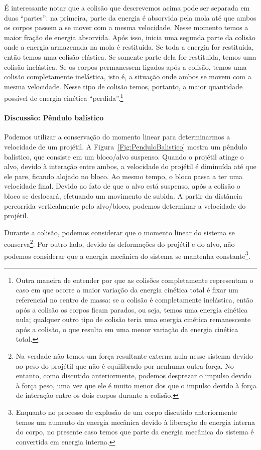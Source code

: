 É interessante notar que a colisão que descrevemos acima pode ser separada em duas ``partes'': na primeira, parte da energia é absorvida pela mola até que ambos os corpos passem a se mover com a mesma velocidade. Nesse momento temos a maior fração de energia absorvida. Após isso, inicia uma segunda parte da colisão onde a energia armazenada na mola é restituida. Se toda a energia for restituida, então temos uma colisão elástica. Se somente parte dela for restituida, temos uma colisão inelástica. Se os corpos permanessem ligados após a colisão, temos uma colisão completamente inelástica, isto é, a situação onde ambos se movem com a mesma velocidade. Nesse tipo de colisão temos, portanto, a maior quantidade possível de energia cinética ``perdida''.\footnote{Outra maneira de entender por que as colisões completamente representam o caso em que ocorre a maior variação da energia cinética total é fixar um referencial no centro de massa: se a colisão é completamente inelástica, então após a colisão os corpos ficam parados, ou seja, temos uma energia cinética nula; qualquer outro tipo de colisão teria uma energia cinética remanescente após a colisão, o que resulta em uma menor variação da energia cinética total.}

\paragraph{Discussão: Pêndulo balístico}

Podemos utilizar a conservação do momento linear para determinarmos a velocidade de um projétil. A Figura~\ref{Fig:PenduloBalistico} mostra um pêndulo balístico, que consiste em um bloco/alvo suspenso. Quando o projétil atinge o alvo, devido à interação entre ambos, a velocidade do projétil é diminuída até que ele pare, ficando alojado no bloco. Ao mesmo tempo, o bloco passa a ter uma velocidade final. Devido ao fato de que o alvo está suspenso, após a colisão o bloco se deslocará, efetuando um movimento de subida. A partir da distância percorrida verticalmente pelo alvo/bloco, podemos determinar a velocidade do projétil.

Durante a colisão, podemos considerar que o momento linear do sistema se conserva\footnote[][-2cm]{Na verdade não temos um força resultante externa nula nesse sistema devido ao peso do projétil que não é equilibrado por nenhuma outra força. No entanto, como discutido anteriormente, podemos desprezar o impulso devido à força peso, uma vez que ele é muito menor dos que o impulso devido à força de interação entre os dois corpos durante a colisão.}. Por outro lado, devido às deformações do projétil e do alvo, não podemos considerar que a energia mecânica do sistema se mantenha constante\footnote{Enquanto no processo de explosão de um corpo discutido anteriormente temos um aumento da energia mecânica devido à liberação de energia interna do corpo, no presente caso temos que parte da energia mecânica do sistema é convertida em energia interna.}.

